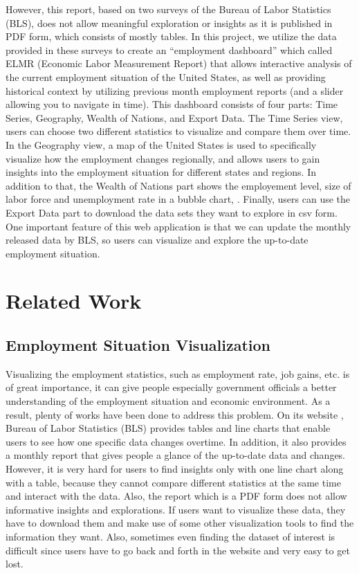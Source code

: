 \documentclass{sigchi}
\begin{document}
However, this report, based on two surveys of the Bureau of Labor Statistics (BLS), does not allow meaningful exploration or insights as it is published in PDF form, which consists of mostly tables. In this project, we utilize the data provided in these surveys to create an ``employment dashboard'' which called ELMR (Economic Labor Measurement Report) that allows interactive analysis of the current employment situation of the United States, as well as providing historical context by utilizing previous month employment reports (and a slider allowing you to navigate in time). This dashboard consists of four parts: Time Series, Geography, Wealth of Nations, and Export Data. The Time Series view, users can choose two different statistics to visualize and compare them over time. In the Geography view, a map of the United States is used to specifically visualize how the employment changes regionally, and allows users to gain insights into the employment situation for different states and regions. In addition to that, the Wealth of Nations part shows the employement level, size of labor force and unemployment rate in a bubble chart, . Finally, users can use the Export Data part to download the data sets they want to explore in csv form. One important feature of this web application is that we can update the monthly released data by BLS, so users can visualize and explore the up-to-date employment situation.


\section{Related Work}

\subsection{Employment Situation Visualization}
Visualizing the employment statistics, such as employment rate, job gains, etc. is of great importance, it can give people especially government officials a better understanding of the employment situation and economic environment. As a result, plenty of works have been done to address this problem. On its website \cite{Labor_data}, Bureau of Labor Statistics (BLS) provides tables and line charts that enable users to see how one specific data changes overtime. In addition, it also provides a monthly report that gives people a glance of the up-to-date data and changes. However, it is very hard for users to find insights only with one line chart along with a table, because they cannot compare different statistics at the same time and interact with the data. Also, the report which is a PDF form does not allow informative insights and explorations. If users want to visualize these data, they have to download them and make use of some other visualization tools to find the information they want. Also, sometimes even finding the dataset of interest is difficult since users have to go back and forth in the website and very easy to get lost.
\end{document}
